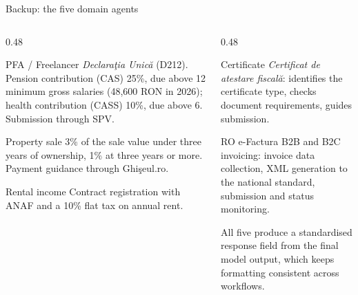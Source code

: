 \documentclass[aspectratio=169,10pt]{beamer}
\newcommand{\cmt}[1]{{\color{stone}\small #1}}          %
\begin{document}
\begin{frame}[noframenumbering]{Backup: the five domain agents}
  \begin{columns}[T]
    \begin{column}{0.48\textwidth}
      \begin{block}{PFA / Freelancer}
        \small \emph{Declara\c{t}ia Unic\u{a}} (D212). Pension contribution (CAS) 25\%, due
        above 12 minimum gross salaries (48,600 RON in 2026); health contribution (CASS) 10\%,
        due above 6. Submission through SPV.
      \end{block}
      \begin{block}{Property sale}
        \small 3\% of the sale value under three years of ownership, 1\% at three years or
        more. Payment guidance through Ghi\c{s}eul.ro.
      \end{block}
      \begin{block}{Rental income}
        \small Contract registration with ANAF and a 10\% flat tax on annual rent.
      \end{block}
    \end{column}
    \begin{column}{0.48\textwidth}
      \begin{block}{Certificate}
        \small \emph{Certificat de atestare fiscal\u{a}}: identifies the certificate type,
        checks document requirements, guides submission.
      \end{block}
      \begin{block}{RO e-Factura}
        \small B2B and B2C invoicing: invoice data collection, XML generation to the national
        standard, submission and status monitoring.
      \end{block}
      \medskip
      \cmt{All five produce a standardised response field from the final model output, which
      keeps formatting consistent across workflows.}
    \end{column}
  \end{columns}
\end{frame}
\end{document}
